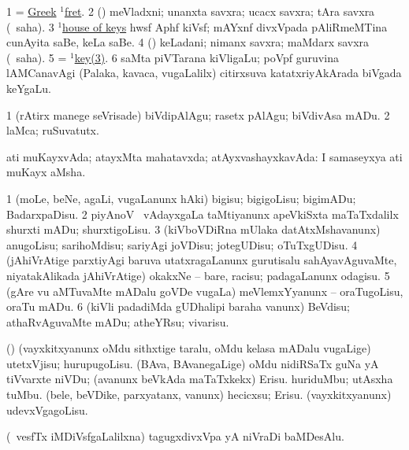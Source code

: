 \noindent
\gl{\pagu}
\bmng
\bnum
\num{1}  = \hyperref{kandict_g.pdf}{G}{Greek(1)}{Greek} \hyperref{kandict_f.pdf}{F}{fret(1)}{$^1$fret}. 
\num{2}  (\saM) meVladxni; unanxta savxra; ucacx savxra; tAra savxra (\rUpa\ saha). 
\num{3} \hyperref{kandict_h.pdf}{H}{house(1) pagu(7)}{$^1$house of keys} hwsf Aphf kiVsf; mAYxnf divxVpada pAliRmeMTina cunAyita saBe, keLa saBe. 
\num{4}  (\saM) keLadani; nimanx savxra; maMdarx savxra (\rUpa\ saha). 
\num{5}  = \hyperlink{key(1)3}{$^1$key(3)}. 
\num{6}  saMta piVTarana kiVligaLu; poVpf guruvina lAMCanavAgi (Palaka, kavaca, \mo vugaLalilx) citirxsuva katatxriyAkArada biVgada keYgaLu. 
\enum
\emng

\noindent
\gl{\nuga}
\bmng
\bnum
\num{1}   (rAtirx manege seVrisade) biVdipAlAgu; rasetx pAlAgu; biVdivAsa mADu. 
\num{2}   laMca; ruSuvatutx. 
\enum
\emng
\eentry

\bentry
{}
\gl{\gu}
\bmng
ati muKayxvAda; atayxMta mahatavxda; atAyxvashayxkavAda:  I samaseyxya ati muKayx aMsha. 
\emng
\eentry

\bentry
{}
\gl{\sakirx}
\bmng
\bnum
\num{1} (moLe, beNe, agaLi, \mo vugaLanunx hAki) bigisu; bigigoLisu; bigimADu; BadarxpaDisu. 
\num{2} piyAnoV \mo\ vAdayxgaLa taMtiyanunx apeVkiSxta maTaTxdalilx shurxti mADu; shurxtigoLisu. 
\num{3} (kiVboVDiRna mUlaka datAtxMshavanunx) anugoLisu; sarihoMdisu; sariyAgi joVDisu; jotegUDisu; oTuTxgUDisu. 
\num{4} (jAhiVrAtige parxtiyAgi baruva utatxragaLanunx gurutisalu sahAyavAguvaMte, niyatakAlikada jAhiVrAtige) okakxNe -- bare, racisu; padagaLanunx odagisu. 
\num{5} (gAre \mo vu aMTuvaMte mADalu goVDe \mo vugaLa) meVlemxYyanunx -- oraTugoLisu, oraTu mADu. 
\num{6} (kiVli padadiMda gUDhalipi baraha \mo vanunx) BeVdisu; athaRvAguvaMte mADu; atheYRsu; vivarisu. 
\enum
\emng

\noindent
\gl{\nuga}
\bmng
{} (\rUpa) 
\banum
{} (vayxkitxyanunx oMdu sithxtige taralu, oMdu kelasa mADalu \mo vugaLige) utetxVjisu; hurupugoLisu. 
 (BAva, BAvanegaLige) oMdu nidiRSaTx guNa yA tiVvarxte niVDu; (avanunx beVkAda maTaTxkekx) Erisu. 
 huriduMbu; utAsxha tuMbu. 
 (bele, beVDike, parxyatanx, \mo vanunx) hecicxsu; Erisu. 
 (vayxkitxyanunx) udevxVgagoLisu. 
\eanum
\emng
\eentry

\bentry
{}
\gl{\nA}
\bmng
(\kanmu\ vesfTx iMDiVsfgaLalilxna) tagugxdivxVpa yA niVraDi baMDesAlu. 
\emng
\eentry

